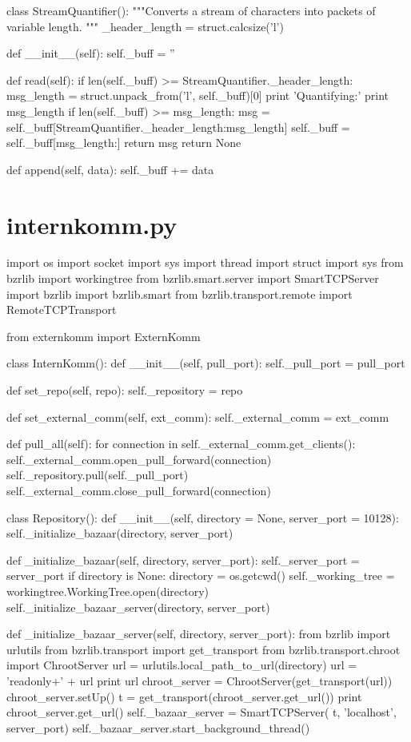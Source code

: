 class StreamQuantifier():
    """Converts a stream of characters into packets of variable length.
    """
    _header_length = struct.calcsize('l')

    def __init__(self):
        self._buff = ''

    def read(self):
        if len(self._buff) >= StreamQuantifier._header_length:
            msg_length = struct.unpack_from('l', self._buff)[0]
            print 'Quantifying:'
            print msg_length
            if len(self._buff) >= msg_length:
                msg = self._buff[StreamQuantifier._header_length:msg_length]
                self._buff = self._buff[msg_length:]
                return msg
        return None

    def append(self, data):
        self._buff += data

\section{internkomm.py}
import os
import socket
import sys
import thread
import struct
import sys
from bzrlib import workingtree
from bzrlib.smart.server import SmartTCPServer
import bzrlib
import bzrlib.smart
from bzrlib.transport.remote import RemoteTCPTransport

from externkomm import ExternKomm


class InternKomm():
    def __init__(self, pull_port):
        self._pull_port = pull_port

    def set_repo(self, repo):
        self._repository = repo

    def set_external_comm(self, ext_comm):
        self._external_comm = ext_comm

    def pull_all(self):
        for connection in self._external_comm.get_clients():
            self._external_comm.open_pull_forward(connection)
            self._repository.pull(self._pull_port)
            self._external_comm.close_pull_forward(connection)

class Repository():
    def __init__(self, directory = None, server_port = 10128):
        self._initialize_bazaar(directory, server_port)

    def _initialize_bazaar(self, directory, server_port):
        self._server_port = server_port
        if directory is None:
            directory = os.getcwd()
        self._working_tree = workingtree.WorkingTree.open(directory)
        self._initialize_bazaar_server(directory, server_port)

    def _initialize_bazaar_server(self, directory, server_port):
        from bzrlib import urlutils
        from bzrlib.transport import get_transport
        from bzrlib.transport.chroot import ChrootServer
        url = urlutils.local_path_to_url(directory)
        url = 'readonly+' + url
        print url
        chroot_server = ChrootServer(get_transport(url))
        chroot_server.setUp()
        t = get_transport(chroot_server.get_url())
        print chroot_server.get_url()
        self._bazaar_server = SmartTCPServer(
            t, 'localhost', server_port)
        self._bazaar_server.start_background_thread()


